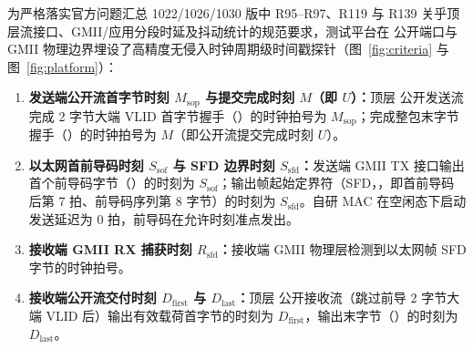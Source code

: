 为严格落实官方问题汇总 1022/1026/1030 版中 R95--R97、R119 与 R139 关乎顶层流接口、GMII/应用分段时延及抖动统计的规范要求，测试平台在  公开端口与 GMII 物理边界埋设了高精度无侵入时钟周期级时间戳探针（图~\ref{fig:criteria} 与图~\ref{fig:platform}）：
\begin{enumerate}
  \item \textbf{发送端公开流首字节时刻 $M_\text{sop}$ 与提交完成时刻 $M$（即 $U$）：}顶层  公开发送流完成 2 字节大端 VLID 首字节握手（）的时钟拍号为 $M_\text{sop}$；完成整包末字节握手（）的时钟拍号为 $M$（即公开流提交完成时刻 $U$）。
  \item \textbf{以太网首前导码时刻 $S_\text{sof}$ 与 SFD 边界时刻 $S_\text{sfd}$：}发送端 GMII TX 接口输出首个前导码字节（）的时刻为 $S_\text{sof}$；输出帧起始定界符（SFD，，即首前导码后第 7 拍、前导码序列第 8 字节）的时刻为 $S_\text{sfd}$。自研 MAC 在空闲态下启动发送延迟为 0 拍，前导码在允许时刻准点发出。
  \item \textbf{接收端 GMII RX 捕获时刻 $R_\text{sfd}$：}接收端 GMII 物理层检测到以太网帧 SFD 字节的时钟拍号。
  \item \textbf{接收端公开流交付时刻 $D_\text{first}$ 与 $D_\text{last}$：}顶层  公开接收流（跳过前导 2 字节大端 VLID 后）输出有效载荷首字节的时刻为 $D_\text{first}$，输出末字节（）的时刻为 $D_\text{last}$。
\end{enumerate}

